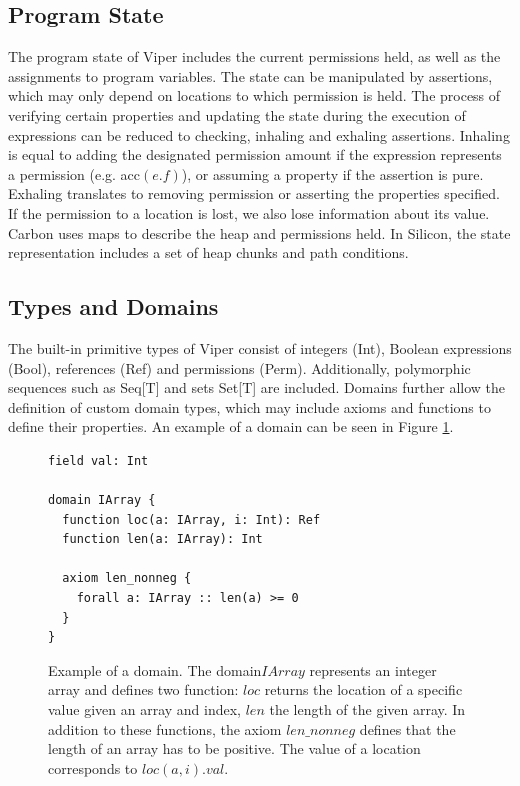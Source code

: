 \documentclass[12pt]{article}
\begin{document}
\subsection{Program State}
The program state of Viper includes the current permissions held, as well as the assignments to program variables. The state can be manipulated by assertions, which may only depend on locations to which permission is held. The process of verifying certain properties and updating the state during the execution of expressions can be reduced to checking, inhaling and exhaling assertions. Inhaling is equal to adding the designated permission amount if the expression represents a permission (e.g. acc\((e.f)\)), or assuming a property if the assertion is pure. Exhaling translates to removing permission or asserting the properties specified. If the permission to a location is lost, we also lose information about its value.
Carbon uses maps to describe the heap and permissions held. In Silicon, the state representation includes a set of heap chunks and path conditions.

\subsection{Types and Domains}
The built-in primitive types of Viper consist of integers (Int), Boolean expressions (Bool), references (Ref) and permissions (Perm). Additionally,  polymorphic sequences such as Seq[T] and sets Set[T] are included. Domains further allow the definition of custom domain types, which may include axioms and functions to define their properties. An example of a domain can be seen in Figure \ref{domainExample}.

\begin{figure}[h]
  \centering
\begin{lstlisting}
field val: Int

domain IArray {
  function loc(a: IArray, i: Int): Ref
  function len(a: IArray): Int

  axiom len_nonneg {
    forall a: IArray :: len(a) >= 0
  }
}
\end{lstlisting}
\caption[predicate example]
   {Example of a domain. The domain\(IArray\) represents an integer array and defines two function: \(loc\) returns the location of a specific value given an array and index, \(len\) the length of the given array. In addition to these functions, the axiom \(len\_nonneg\) defines that the length of an array has to be positive. The value of a location corresponds to \(loc(a, i).val\).}
\label{domainExample}
\end{figure}
\end{document}
